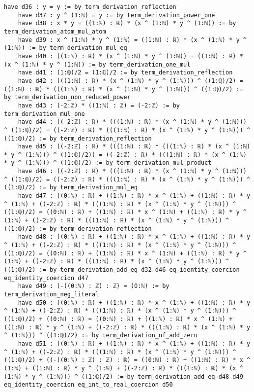 \documentclass{article}
\begin{document}
\begin{tcolorbox}[colback=white!10, width=\linewidth]
\begin{lstlisting}[language=Lean4]
    have d36 : y = y := by term_derivation_reflection
    have d37 : y ^ (1:ℕ) = y := by term_derivation_power_one
    have d38 : x * y = ((1:ℕ) : ℝ) * (x ^ (1:ℕ) * y ^ (1:ℕ)) := by term_derivation_atom_mul_atom
    have d39 : x ^ (1:ℕ) * y ^ (1:ℕ) = ((1:ℕ) : ℝ) * (x ^ (1:ℕ) * y ^ (1:ℕ)) := by term_derivation_mul_eq
    have d40 : ((1:ℕ) : ℝ) * (x ^ (1:ℕ) * y ^ (1:ℕ)) = ((1:ℕ) : ℝ) * (x ^ (1:ℕ) * y ^ (1:ℕ)) := by term_derivation_one_mul
    have d41 : (1:ℚ)/2 = (1:ℚ)/2 := by term_derivation_reflection
    have d42 : (((1:ℕ) : ℝ) * (x ^ (1:ℕ) * y ^ (1:ℕ))) ^ ((1:ℚ)/2) = ((1:ℕ) : ℝ) * (((1:ℕ) : ℝ) * (x ^ (1:ℕ) * y ^ (1:ℕ))) ^ ((1:ℚ)/2) := by term_derivation_non_reduced_power
    have d43 : (-2:ℤ) * ((1:ℕ) : ℤ) = (-2:ℤ) := by term_derivation_mul_one
    have d44 : ((-2:ℤ) : ℝ) * (((1:ℕ) : ℝ) * (x ^ (1:ℕ) * y ^ (1:ℕ))) ^ ((1:ℚ)/2) = ((-2:ℤ) : ℝ) * (((1:ℕ) : ℝ) * (x ^ (1:ℕ) * y ^ (1:ℕ))) ^ ((1:ℚ)/2) := by term_derivation_reflection
    have d45 : ((-2:ℤ) : ℝ) * (((1:ℕ) : ℝ) * (((1:ℕ) : ℝ) * (x ^ (1:ℕ) * y ^ (1:ℕ))) ^ ((1:ℚ)/2)) = ((-2:ℤ) : ℝ) * (((1:ℕ) : ℝ) * (x ^ (1:ℕ) * y ^ (1:ℕ))) ^ ((1:ℚ)/2) := by term_derivation_mul_product
    have d46 : ((-2:ℤ) : ℝ) * (((1:ℕ) : ℝ) * (x ^ (1:ℕ) * y ^ (1:ℕ))) ^ ((1:ℚ)/2) = ((-2:ℤ) : ℝ) * (((1:ℕ) : ℝ) * (x ^ (1:ℕ) * y ^ (1:ℕ))) ^ ((1:ℚ)/2) := by term_derivation_mul_eq
    have d47 : ((0:ℕ) : ℝ) + ((1:ℕ) : ℝ) * x ^ (1:ℕ) + ((1:ℕ) : ℝ) * y ^ (1:ℕ) + ((-2:ℤ) : ℝ) * (((1:ℕ) : ℝ) * (x ^ (1:ℕ) * y ^ (1:ℕ))) ^ ((1:ℚ)/2) = ((0:ℕ) : ℝ) + ((1:ℕ) : ℝ) * x ^ (1:ℕ) + ((1:ℕ) : ℝ) * y ^ (1:ℕ) + ((-2:ℤ) : ℝ) * (((1:ℕ) : ℝ) * (x ^ (1:ℕ) * y ^ (1:ℕ))) ^ ((1:ℚ)/2) := by term_derivation_reflection
    have d48 : ((0:ℕ) : ℝ) + ((1:ℕ) : ℝ) * x ^ (1:ℕ) + ((1:ℕ) : ℝ) * y ^ (1:ℕ) + ((-2:ℤ) : ℝ) * (((1:ℕ) : ℝ) * (x ^ (1:ℕ) * y ^ (1:ℕ))) ^ ((1:ℚ)/2) = ((0:ℕ) : ℝ) + ((1:ℕ) : ℝ) * x ^ (1:ℕ) + ((1:ℕ) : ℝ) * y ^ (1:ℕ) + ((-2:ℤ) : ℝ) * (((1:ℕ) : ℝ) * (x ^ (1:ℕ) * y ^ (1:ℕ))) ^ ((1:ℚ)/2) := by term_derivation_add_eq d32 d46 eq_identity_coercion eq_identity_coercion d47
    have d49 : (-((0:ℕ) : ℤ) : ℤ) = (0:ℕ) := by term_derivation_neg_literal
    have d50 : ((0:ℕ) : ℝ) + ((1:ℕ) : ℝ) * x ^ (1:ℕ) + ((1:ℕ) : ℝ) * y ^ (1:ℕ) + ((-2:ℤ) : ℝ) * (((1:ℕ) : ℝ) * (x ^ (1:ℕ) * y ^ (1:ℕ))) ^ ((1:ℚ)/2) + ((0:ℕ) : ℝ) = ((0:ℕ) : ℝ) + ((1:ℕ) : ℝ) * x ^ (1:ℕ) + ((1:ℕ) : ℝ) * y ^ (1:ℕ) + ((-2:ℤ) : ℝ) * (((1:ℕ) : ℝ) * (x ^ (1:ℕ) * y ^ (1:ℕ))) ^ ((1:ℚ)/2) := by term_derivation_nf_add_zero
    have d51 : ((0:ℕ) : ℝ) + ((1:ℕ) : ℝ) * x ^ (1:ℕ) + ((1:ℕ) : ℝ) * y ^ (1:ℕ) + ((-2:ℤ) : ℝ) * (((1:ℕ) : ℝ) * (x ^ (1:ℕ) * y ^ (1:ℕ))) ^ ((1:ℚ)/2) + ((-((0:ℕ) : ℤ) : ℤ) : ℝ) = ((0:ℕ) : ℝ) + ((1:ℕ) : ℝ) * x ^ (1:ℕ) + ((1:ℕ) : ℝ) * y ^ (1:ℕ) + ((-2:ℤ) : ℝ) * (((1:ℕ) : ℝ) * (x ^ (1:ℕ) * y ^ (1:ℕ))) ^ ((1:ℚ)/2) := by term_derivation_add_eq d48 d49 eq_identity_coercion eq_int_to_real_coercion d50

\end{lstlisting}
\end{tcolorbox}
\end{document}
